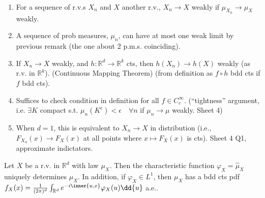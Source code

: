 \begin{remark} \
	\begin{enumerate}
		\item For a sequence of r.v.s $X_n$ and $X$ another r.v., $X_n \to X$ weakly if $\mu_{X_n} \to \mu_X$ weakly.
		\item A sequence of prob measures, $\mu_n$, can have at most one weak limit by previous remark (the one about 2 p.m.s. coinciding).
		\item If $X_n \to X$ weakly, and $h : \mathbb{R}^d \to \mathbb{R}^k$ cts, then $h(X_n) \to h(X)$ weakly (as r.v. in $\mathbb{R}^k$). (Continuous Mapping Theorem) (from definition as $f \circ h$ bdd cts if $f$ bdd cts).
		\item Suffices to check condition in definition for all $f \in C_c^\infty$. (``tightness'' argument, i.e. $\exists K$ compact s.t. $\mu_n(K^c) < \epsilon \quad \forall n$ if $\mu_n \to \mu$ weakly. Sheet 4)
		\item When $d = 1$, this is equivalent to $X_n \to X$ in distribution (i.e., $F_{X_n}(x) \to F_X(x)$ at all points where $x \mapsto F_X(x)$ is cts). Sheet 4 Q1, approximate indictators.
	\end{enumerate}
\end{remark}

\begin{theorem}
	Let $X$ be a r.v. in $\mathbb R^d$ with law $\mu_X$.
	Then the characteristic function $\varphi_X = \hat \mu_X$ uniquely determines $\mu_X$.
	In addition, if $\varphi_X \in L^1$, then $\mu_X$ has a bdd cts pdf $f_X(x) = \frac{1}{(2\pi)^d} \int_{\mathbb R^d} e^{-i\inner{u,x}} \varphi_X(u) \dd{u}$ a.e..
\end{theorem}

